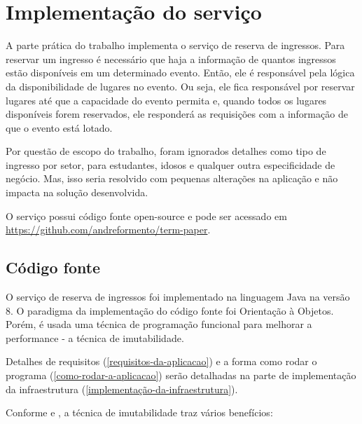 \chapter{Implementação do serviço}\label{implementacao-do-servico}


A parte prática do trabalho implementa o serviço de reserva de ingressos.
Para reservar um ingresso é necessário que haja a informação de quantos ingressos
estão disponíveis em um determinado evento.
Então, ele é responsável pela lógica da disponibilidade de lugares no evento.
Ou seja, ele fica responsável por reservar lugares até que a capacidade do
evento permita e, quando todos os lugares disponíveis forem reservados,
ele responderá as requisições com a informação de que o evento está lotado.

Por questão de escopo do trabalho,
foram ignorados detalhes como
tipo de ingresso por setor, para estudantes, idosos e qualquer outra especificidade
de negócio. Mas, isso seria resolvido com pequenas alterações na aplicação
e não impacta na solução desenvolvida.

O serviço possui código fonte open-source e pode ser acessado em
\url{https://github.com/andreformento/term-paper}.

\section{Código fonte}

O serviço de reserva de ingressos foi implementado na linguagem Java na versão 8. O paradigma
da implementação do código fonte foi Orientação à Objetos. Porém, é usada uma técnica de
programação funcional para melhorar a performance - a técnica de imutabilidade.

Detalhes de requisitos (\autoref{requisitos-da-aplicacao}) e a
forma como rodar o programa (\autoref{como-rodar-a-aplicacao}) serão detalhadas
na parte de implementação da infraestrutura (\autoref{implementação-da-infraestrutura}).

Conforme
\cite{does-immutability-really-mean-thread-safety} e \cite{java-doc-immutable-objects},
a técnica de imutabilidade traz vários benefícios:

